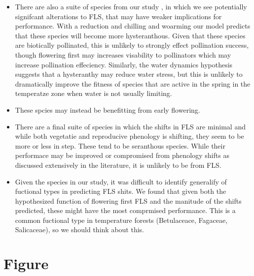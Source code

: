 \documentclass[11pt]{article}
\begin{document}
\begin{itemize}
\item There are also a suite of species from our study , in which we see potentially signifcant alterations to FLS, that may have weaker implications for performance. With a reduction and chilling and woarming our model predicts that these species will become more hysteranthous. Given that these species are biotically pollinated, this is unlikely to strongly effect pollination success, though flowering first may increases visability to pollinators \citep{Janzen} which may increase pollination effeciency. Similarly, the water dynamics hypothesis suggests that a hysteranthy may reduce water stress, but this is unlikely to dramatically improve the fitness of species that are active in the spring in the temperatze zone when water is not usually limiting.
\item These spcies may instead be benefitting from early flowering.
\item There are a final suite of species in which the shifts in FLS are minimal and while both vegetatie and reproducive phenology is shifting, they seem to be more or less in step. These tend to be seranthous species. While their performace may be improved or compromised from phenology shifts as discussed extensively in the literature, it is unlikely to be from FLS.

\item Given the species in our study, it was difficult to identify generalify of fuctional types in predicting FLS shits. We found that given both the hypothesized function of flowering first FLS and the manitude of the shifts predicted, these might have the most comprmised performance. This is a common fuctional type in temperature forests (Betulaceace, Fagaceae, Salicaceae), so we should think about this.
\end{itemize}
\section{Figure}
\end{document}
